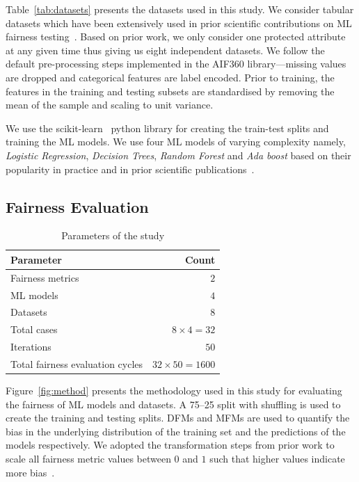 \documentclass[conference]{IEEEtran}
\begin{document}
Table \ref{tab:datasets} presents the datasets used in this study. We
consider tabular datasets which have been extensively used in prior
scientific contributions on ML fairness
testing \cite{zhang2021ignorance,biswas2020machine,biswas2021fair,chen2022fairness}. Based
on prior work, we only consider one protected attribute at any given
time thus giving us eight independent datasets. We follow the default
pre-processing steps implemented in the AIF360 library---missing
values are dropped and categorical features are label encoded. Prior
to training, the features in the training and testing subsets are
standardised by removing the mean of the sample and scaling to unit
variance.

We use the scikit-learn \cite{pedregosa2011scikit} python library for
creating the train-test splits and training the ML models. We use four
ML models of varying complexity namely, \emph{Logistic Regression},
\emph{Decision Trees}, \emph{Random Forest} and \emph{Ada boost} based
on their popularity in practice and in prior scientific
publications \cite{zhang2021ignorance,biswas2021fair,biswas2020machine}.

\subsection{Fairness Evaluation}\label{sec:method-fair-eval}

\begin{table}
  \centering
  \caption{Parameters of the study}
  \begin{tabular}{l r}
    \hline
    \textbf{Parameter} & \textbf{Count}\\
    \hline
    Fairness metrics & $2$\\
    ML models & $4$\\
    Datasets & $8$\\
    Total cases & $8\times4=32$\\
    Iterations & $50$\\
    Total fairness evaluation cycles & $32\times50=1600$\\
    \hline
  \end{tabular}
  \label{tab:parameters}
\end{table}

Figure \ref{fig:method} presents the methodology used in this study
for evaluating the fairness of ML models and datasets. A 75--25 split
with shuffling is used to create the training and testing splits. DFMs
and MFMs are used to quantify the bias in the underlying distribution
of the training set and the predictions of the models respectively. We
adopted the transformation steps from prior work to scale all fairness
metric values between $0$ and $1$ such that higher values indicate
more bias \cite{zhang2021ignorance,hort2021fairea}.
\end{document}

